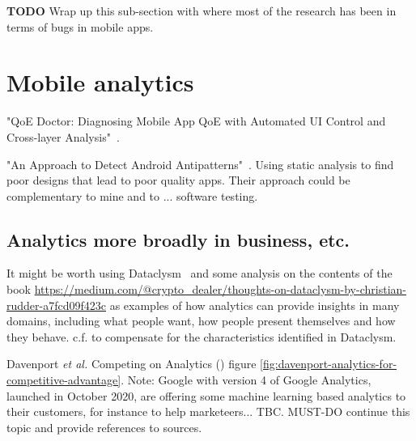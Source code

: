 \textbf{TODO} Wrap up this sub-section with where most of the research has been in terms of bugs in mobile apps.



\section{Mobile analytics}

"QoE Doctor: Diagnosing Mobile App QoE with Automated UI Control and Cross-layer Analysis"~\cite{chen2014qoe}.


"An Approach to Detect Android Antipatterns"~\cite{hecht2015approach}. Using static analysis to find poor designs that lead to poor quality apps. Their approach could be complementary to mine and to ... software testing.


\subsection{Analytics more broadly in business, etc.}
It might be worth using Dataclysm~ and some analysis on the contents of the book \url{https://medium.com/@crypto_dealer/thoughts-on-dataclysm-by-christian-rudder-a7fcd09f423c} as examples of how analytics can provide insights in many domains, including what people want, how people present themselves and how they behave. c.f. \cite{GAVIDIACALDERON2021_game_theoretic_analysis_of_software_development_practices} to compensate for the characteristics identified in Dataclysm.

Davenport \textit{et al.} Competing on Analytics (\cite{davenport2017competing_on_analytics}) figure \ref{fig:davenport-analytics-for-competitive-advantage}. Note: Google with version 4 of Google Analytics, launched in October 2020, are offering some machine learning based analytics to their customers, for instance to help marketeers... TBC. MUST-DO continue this topic and provide references to sources.
    
